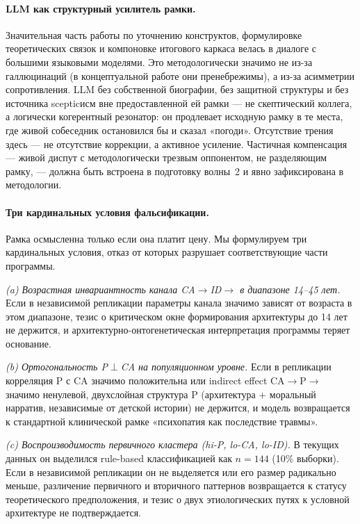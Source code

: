 \paragraph{LLM как структурный усилитель рамки.} Значительная часть работы по уточнению конструктов, формулировке теоретических связок и компоновке итогового каркаса велась в диалоге с большими языковыми моделями. Это методологически значимо не из-за галлюцинаций (в концептуальной работе они пренебрежимы), а из-за асимметрии сопротивления. LLM без собственной биографии, без защитной структуры и без источника scepticисм вне предоставленной ей рамки --- не скептический коллега, а логически когерентный резонатор: он продлевает исходную рамку в те места, где живой собеседник остановился бы и сказал «погоди». Отсутствие трения здесь --- не отсутствие коррекции, а активное усиление. Частичная компенсация --- живой диспут с методологически трезвым оппонентом, не разделяющим рамку, --- должна быть встроена в подготовку волны~2 и явно зафиксирована в методологии.

\paragraph{Три кардинальных условия фальсификации.} Рамка осмысленна только если она платит цену. Мы формулируем три кардинальных условия, отказ от которых разрушает соответствующие части программы.

\emph{(a) Возрастная инвариантность канала CA$\to$ID$\to$\EAF{} в диапазоне 14--45 лет.} Если в независимой репликации параметры канала значимо зависят от возраста в этом диапазоне, тезис о критическом окне формирования архитектуры до 14 лет не держится, и архитектурно-онтогенетическая интерпретация программы теряет основание.

\emph{(b) Ортогональность P$\perp$CA на популяционном уровне.} Если в репликации корреляция P с CA значимо положительна или indirect effect CA$\to$P$\to$\EAF{} значимо ненулевой, двухслойная структура P (архитектура $+$ моральный нарратив, независимые от детской истории) не держится, и модель возвращается к стандартной клинической рамке «психопатия как последствие травмы».

\emph{(c) Воспроизводимость первичного кластера (hi-P, lo-CA, lo-ID).} В текущих данных он выделился rule-based классификацией как $n = 144$ (10\% выборки). Если в независимой репликации он не выделяется или его размер радикально меньше, различение первичного и вторичного паттернов возвращается к статусу теоретического предположения, и тезис о двух этиологических путях к условной архитектуре не подтверждается.

